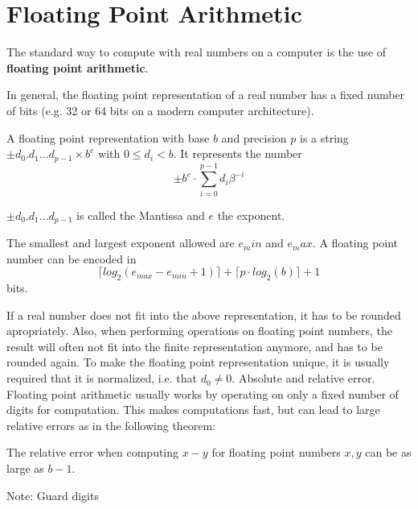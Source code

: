 \section{Floating Point Arithmetic}
The standard way to compute with real numbers on a computer is the use 
of \textbf{floating point arithmetic}. 

In general, the floating point representation of a real number has a fixed number of bits (e.g. 32 or 64 bits on a modern computer architecture).
\begin{definition}\label{def: floating point number}
	A floating point representation with base $b$ and precision $p$
	is a string $\pm d_0 . d_1 \dots d_{p-1} \times b^e$ with $0 \leq d_i < b$.	
	It represents the number
	$$ \pm b^e \cdot \sum_{i=0}^{p-1} d_i\beta^{-i} $$ 

	$\pm d_0 . d_1 \dots d_{p-1}$ is called the Mantissa and $e$ the exponent.
	
	The smallest and largest exponent allowed are $e_min$ and $e_max$.
	A floating point number can be encoded in
	$$ \lceil log_2(e_{max}-e_{min}+1) \rceil + \lceil  p \cdot log_2 (b) \rceil + 1 $$
	bits.
\end{definition}
If a real number does not fit into the above representation, it has to be rounded apropriately.
Also, when performing operations on floating point numbers, the result will often not fit into the finite representation anymore, 
and has to be rounded again.
To make the floating point representation unique, it is usually required that it is normalized, i.e. that $d_0 \neq 0$.
Absolute and relative error.
Floating point arithmetic usually works by operating on only a fixed number of digits for computation.
This makes computations fast, but can lead to large relative errors as in the following theorem: 
\begin{theorem}
	The relative error when computing $x-y$ for floating point numbers $x,y$ can be as large as $b-1$. 
\end{theorem}
Note: Guard digits
